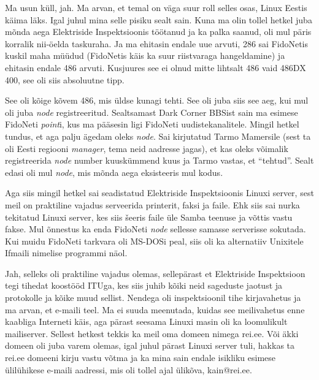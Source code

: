 
Ma usun küll, jah. Ma arvan, et temal on väga suur roll selles osas, Linux 
Eestis käima läks. Igal juhul mina selle pisiku sealt sain. Kuna ma olin tollel 
hetkel juba mõnda aega Elektriside Inspektsioonis töötanud ja ka palka saanud, oli mul päris korralik nii-öelda  
taskuraha. Ja ma ehitasin  endale uue arvuti, 286 sai FidoNetis  kuskil maha 
müüdud (FidoNetis  käis ka suur riistvaraga hangeldamine) ja ehitasin endale 
486 arvuti. Kusjuures see ei olnud mitte lihtsalt 486 vaid 486DX 
400, see oli siis absoluutne tipp. 

See oli kõige kõvem 486, mis üldse kunagi tehti. See oli  juba siis see aeg, 
kui mul oli juba \emph{node} registreeritud. Sealtsamast Dark Corner 
BBSist sain ma esimese FidoNeti \emph{point}i, kus ma 
pääsesin ligi FidoNeti uudistekanalitele. Mingil hetkel tundus, et aga palju 
ägedam oleks \emph{node}. Sai kirjutatud Tarmo Mamersile (sest ta oli Eesti regiooni \emph{manager}, tema neid aadresse jagas), 
et kas oleks võimalik registreerida \emph{node} number kuuskümmend kuus ja 
Tarmo vastas, et \enquote{tehtud}. Sealt edasi oli mul \emph{node}, mis mõnda 
aega eksisteeris mul kodus. 

Aga siis mingil hetkel sai seadistatud Elektriside Inspektsioonis 
Linuxi server, sest meil on praktiline vajadus serveerida 
printerit, faksi ja faile. Ehk siis sai nurka tekitatud Linuxi server, kes siis 
šeeris faile üle Samba teenuse ja võttis vastu fakse. Mul õnnestus ka enda 
FidoNeti \emph{node} sellesse samasse serverisse sokutada. Kui muidu FidoNeti 
tarkvara oli MS-DOSi peal, siis  oli ka alternatiiv Unixitele 
Ifmaili nimelise programmi näol.


Jah, selleks oli praktiline vajadus  olemas, sellepärast et Elektriside 
Inspektsioon tegi tihedat koostööd 
ITUga, kes siis 
juhib kõiki neid sageduste jaotust ja protokolle ja  kõike muud sellist. 
Nendega oli inspektsioonil tihe kirjavahetus ja ma arvan, et e-maili teel. Ma 
ei suuda meenutada, kuidas see meilivahetus enne kaabliga Interneti käis, aga  
pärast  seesama Linuxi masin oli ka loomulikult mailiserver. Sellest hetkest 
tekkis ka meil oma domeen nimega rei.ee. Või äkki domeen oli juba varem olemas, 
igal juhul pärast Linuxi server tuli, hakkas ta rei.ee domeeni  kirju vastu 
võtma ja ka mina sain endale isikliku esimese ülilühikese e-maili aadressi, mis 
oli tollel ajal ülikõva, kain@rei.ee.


